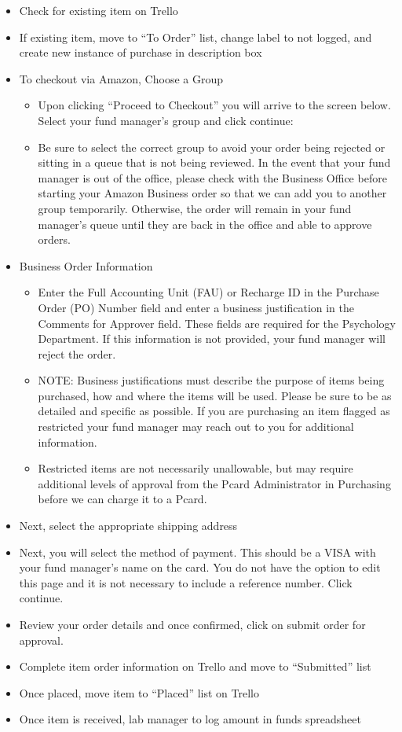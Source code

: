 \documentclass[]{book}
\providecommand{\tightlist}{%
  \setlength{\itemsep}{0pt}\setlength{\parskip}{0pt}}
\begin{document}
\begin{itemize}
\tightlist
\item
  Check for existing item on Trello
\item
  If existing item, move to ``To Order'' list, change label to not logged, and create new instance of purchase in description box
\item
  To checkout via Amazon, Choose a Group

  \begin{itemize}
  \tightlist
  \item
    Upon clicking ``Proceed to Checkout'' you will arrive to the screen below. Select your fund manager's group and click continue:
  \item
    Be sure to select the correct group to avoid your order being rejected or sitting in a queue that is not being reviewed. In the event that your fund manager is out of the office, please check with the Business Office before starting your Amazon Business order so that we can add you to another group temporarily. Otherwise, the order will remain in your fund manager's queue until they are back in the office and able to approve orders.
  \end{itemize}
\item
  Business Order Information

  \begin{itemize}
  \tightlist
  \item
    Enter the Full Accounting Unit (FAU) or Recharge ID in the Purchase Order (PO) Number field and enter a business justification in the Comments for Approver field. These fields are required for the Psychology Department. If this information is not provided, your fund manager will reject the order.
  \item
    NOTE: Business justifications must describe the purpose of items being purchased, how and where the items will be used. Please be sure to be as detailed and specific as possible. If you are purchasing an item flagged as restricted your fund manager may reach out to you for additional information.\\
  \item
    Restricted items are not necessarily unallowable, but may require additional levels of approval from the Pcard Administrator in Purchasing before we can charge it to a Pcard.
  \end{itemize}
\item
  Next, select the appropriate shipping address
\item
  Next, you will select the method of payment. This should be a VISA with your fund manager's name on the card. You do not have the option to edit this page and it is not necessary to include a reference number. Click continue.
\item
  Review your order details and once confirmed, click on submit order for approval.
\item
  Complete item order information on Trello and move to ``Submitted'' list
\item
  Once placed, move item to ``Placed'' list on Trello
\item
  Once item is received, lab manager to log amount in funds spreadsheet


\end{itemize}
\end{document}
